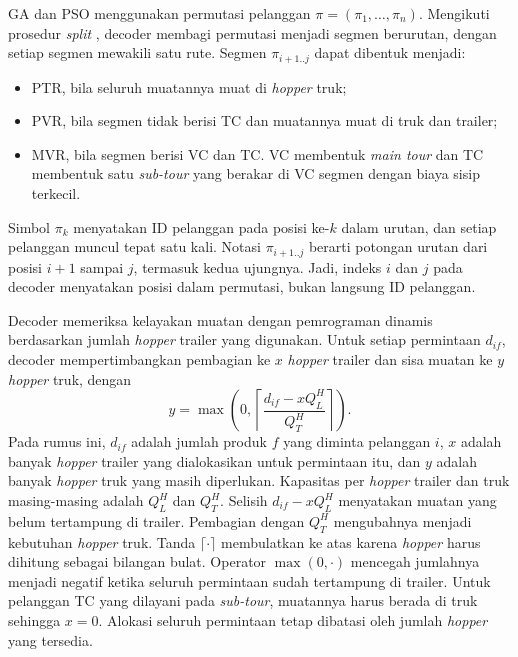 \documentclass[conference]{IEEEtran}
\begin{document}
GA dan PSO menggunakan permutasi pelanggan $\pi=(\pi_1,\dots,\pi_n)$. Mengikuti prosedur \textit{split} \cite{prins2004}, decoder membagi permutasi menjadi segmen berurutan, dengan setiap segmen mewakili satu rute. Segmen $\pi_{i+1..j}$ dapat dibentuk menjadi:
\begin{itemize}
\item PTR, bila seluruh muatannya muat di \textit{hopper} truk;
\item PVR, bila segmen tidak berisi TC dan muatannya muat di truk dan trailer;
\item MVR, bila segmen berisi VC dan TC. VC membentuk \textit{main tour} dan TC membentuk satu \textit{sub-tour} yang berakar di VC segmen dengan biaya sisip terkecil.
\end{itemize}
Simbol $\pi_k$ menyatakan ID pelanggan pada posisi ke-$k$ dalam urutan, dan setiap pelanggan muncul tepat satu kali. Notasi $\pi_{i+1..j}$ berarti potongan urutan dari posisi $i+1$ sampai $j$, termasuk kedua ujungnya. Jadi, indeks $i$ dan $j$ pada decoder menyatakan posisi dalam permutasi, bukan langsung ID pelanggan.

Decoder memeriksa kelayakan muatan dengan pemrograman dinamis berdasarkan jumlah \textit{hopper} trailer yang digunakan. Untuk setiap permintaan $d_{if}$, decoder mempertimbangkan pembagian ke $x$ \textit{hopper} trailer dan sisa muatan ke $y$ \textit{hopper} truk, dengan
\[
y=\max\!\left(0,\left\lceil\frac{d_{if}-xQ_L^H}{Q_T^H}\right\rceil\right).
\]
Pada rumus ini, $d_{if}$ adalah jumlah produk $f$ yang diminta pelanggan $i$, $x$ adalah banyak \textit{hopper} trailer yang dialokasikan untuk permintaan itu, dan $y$ adalah banyak \textit{hopper} truk yang masih diperlukan. Kapasitas per \textit{hopper} trailer dan truk masing-masing adalah $Q_L^H$ dan $Q_T^H$. Selisih $d_{if}-xQ_L^H$ menyatakan muatan yang belum tertampung di trailer. Pembagian dengan $Q_T^H$ mengubahnya menjadi kebutuhan \textit{hopper} truk. Tanda $\lceil\cdot\rceil$ membulatkan ke atas karena \textit{hopper} harus dihitung sebagai bilangan bulat. Operator $\max(0,\cdot)$ mencegah jumlahnya menjadi negatif ketika seluruh permintaan sudah tertampung di trailer. Untuk pelanggan TC yang dilayani pada \textit{sub-tour}, muatannya harus berada di truk sehingga $x=0$. Alokasi seluruh permintaan tetap dibatasi oleh jumlah \textit{hopper} yang tersedia.
\end{document}
